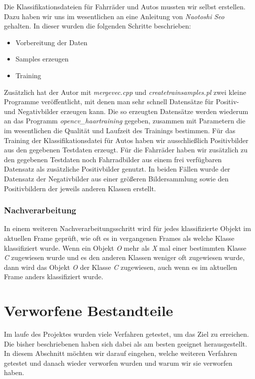 \documentclass[conference]{IEEEtran}
\begin{document}
Die Klassifikationsdateien für Fahrräder und Autos mussten wir selbst erstellen.
Dazu haben wir uns im wesentlichen an eine Anleitung\cite{Seo:Haartraining} von \textit{Naotoshi Seo} gehalten. In dieser wurden die folgenden Schritte beschrieben:
\begin{itemize}
	\item Vorbereitung der Daten
	\item Samples erzeugen
	\item Training
\end{itemize}
Zusätzlich hat der Autor mit \textit{mergevec.cpp} und \textit{createtrainsamples.pl} zwei kleine Programme veröffentlicht, mit denen man sehr schnell Datensätze für Positiv- und Negativbilder erzeugen kann. Die so erzeugten Datensätze werden wiederum an das Programm \textit{opencv\_haartraining} gegeben, zusammen mit Parametern die im wesentlichen die Qualität und Laufzeit des Trainings bestimmen.
Für das Training der Klassifikationsdatei für Autos haben wir ausschließlich Positivbilder aus den gegebenen Testdaten erzeugt. Für die Fahrräder haben wir zusätzlich zu den gegebenen Testdaten noch Fahrradbilder aus einem frei verfügbaren Datensatz\cite{Caltech256} als zusätzliche Positivbilder genutzt. In beiden Fällen wurde der Datensatz der Negativbilder aus einer größeren Bildersammlung sowie den Positivbildern der jeweils anderen Klassen erstellt.

\subsubsection{Nachverarbeitung}
In einem weiteren Nachverarbeitungsschritt wird für jedes klassifizierte Objekt im aktuellen Frame geprüft, wie oft es in vergangenen Frames als welche Klasse klassifiziert wurde. Wenn ein Objekt \textit{O} mehr als \textit{X} mal einer bestimmten Klasse \textit{C} zugewiesen wurde und es den anderen Klassen weniger oft zugewiesen wurde, dann wird das Objekt \textit{O} der Klasse \textit{C} zugewiesen, auch wenn es im aktuellen Frame anders klassifiziert wurde.

\section{Verworfene Bestandteile}
Im laufe des Projektes wurden viele Verfahren getestet, um das Ziel zu erreichen. Die bisher beschriebenen haben sich dabei als am besten geeignet herausgestellt. In diesem Abschnitt möchten wir darauf eingehen, welche weiteren Verfahren getestet und danach wieder verworfen wurden und warum wir sie verworfen haben.
\end{document}
